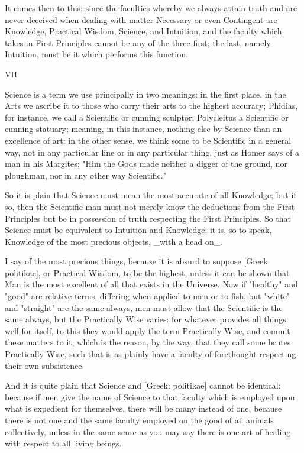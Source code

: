 It comes then to this: since the faculties whereby we always attain
truth and are never deceived when dealing with matter Necessary or even
Contingent are Knowledge, Practical Wisdom, Science, and Intuition, and
the faculty which takes in First Principles cannot be any of the three
first; the last, namely Intuition, must be it which performs this
function.

VII

Science is a term we use principally in two meanings: in the first
place, in the Arts we ascribe it to those who carry their arts to the
highest accuracy; Phidias, for instance, we call a Scientific or cunning
sculptor; Polycleitus a Scientific or cunning statuary; meaning, in this
instance, nothing else by Science than an excellence of art: in the
other sense, we think some to be Scientific in a general way, not in any
particular line or in any particular thing, just as Homer says of a man
in his Margites; "Him the Gods made neither a digger of the ground, nor
ploughman, nor in any other way Scientific."

So it is plain that Science must mean the most accurate of all
Knowledge; but if so, then the Scientific man must not merely know the
deductions from the First Principles but be in possession of truth
respecting the First Principles. So that Science must be equivalent
to Intuition and Knowledge; it is, so to speak, Knowledge of the most
precious objects, _with a head on_.

I say of the most precious things, because it is absurd to suppose
[Greek: politikae], or Practical Wisdom, to be the highest, unless it
can be shown that Man is the most excellent of all that exists in the
Universe. Now if "healthy" and "good" are relative terms, differing
when applied to men or to fish, but "white" and "straight" are the same
always, men must allow that the Scientific is the same always, but the
Practically Wise varies: for whatever provides all things well for
itself, to this they would apply the term Practically Wise, and commit
these matters to it; which is the reason, by the way, that they call
some brutes Practically Wise, such that is as plainly have a faculty of
forethought respecting their own subsistence.

And it is quite plain that Science and [Greek: politikae] cannot be
identical: because if men give the name of Science to that faculty which
is employed upon what is expedient for themselves, there will be many
instead of one, because there is not one and the same faculty employed
on the good of all animals collectively, unless in the same sense as you
may say there is one art of healing with respect to all living beings.

